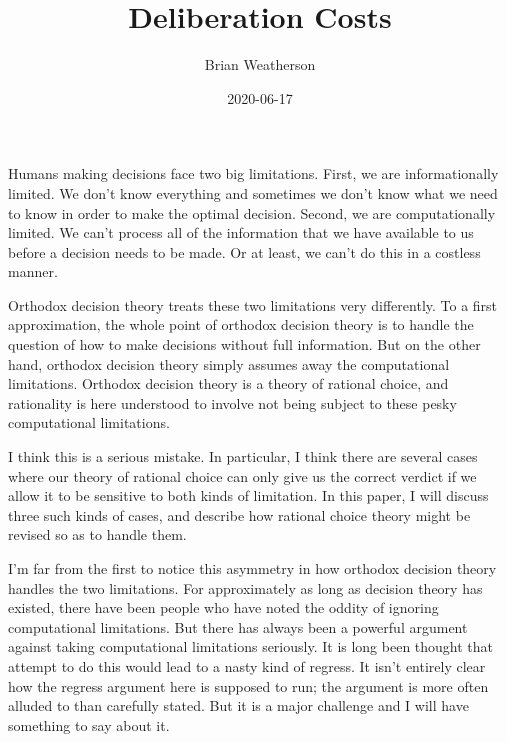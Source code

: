 \documentclass[
  11pt,
  letterpaper,
  DIV=11,
  numbers=noendperiod,
  oneside]{scrartcl}
\title{Deliberation Costs}
\author{Brian Weatherson}
\date{2020-06-17}
\begin{document}
\maketitle
Humans making decisions face two big limitations. First, we are
informationally limited. We don't know everything and sometimes we don't
know what we need to know in order to make the optimal decision. Second,
we are computationally limited. We can't process all of the information
that we have available to us before a decision needs to be made. Or at
least, we can't do this in a costless manner.


Orthodox decision theory treats these two limitations very differently.
To a first approximation, the whole point of orthodox decision theory is
to handle the question of how to make decisions without full
information. But on the other hand, orthodox decision theory simply
assumes away the computational limitations. Orthodox decision theory is
a theory of rational choice, and rationality is here understood to
involve not being subject to these pesky computational limitations.


I think this is a serious mistake. In particular, I think there are
several cases where our theory of rational choice can only give us the
correct verdict if we allow it to be sensitive to both kinds of
limitation. In this paper, I will discuss three such kinds of cases, and
describe how rational choice theory might be revised so as to handle
them.

I'm far from the first to notice this asymmetry in how orthodox decision
theory handles the two limitations. For approximately as long as
decision theory has existed, there have been people who have noted the
oddity of ignoring computational limitations. But there has always been
a powerful argument against taking computational limitations seriously.
It is long been thought that attempt to do this would lead to a nasty
kind of regress. It isn't entirely clear how the regress argument here
is supposed to run; the argument is more often alluded to than carefully
stated. But it is a major challenge and I will have something to say
about it.
\end{document}
